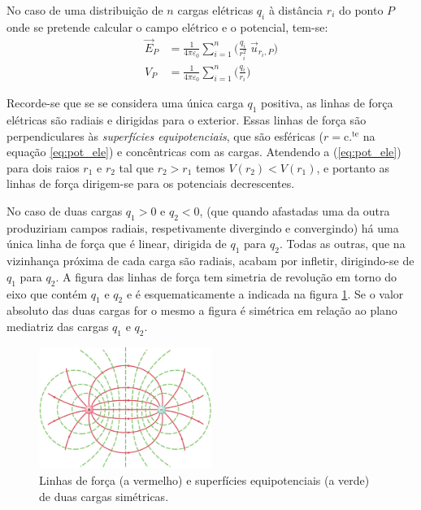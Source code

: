 \documentclass[a4paper,twoside,12pt]{article}      %
\begin{document}
No caso de uma distribuição de $n$ cargas elétricas $q_i$ à distância $r_i$ do ponto $P$ onde se pretende calcular o campo elétrico e o potencial, tem-se:
\begin{align}
	\vec{E}_P &= \frac{1}{4 \pi \varepsilon_0 } \sum_{i=1}^n \Big( \frac{q_i}{ r_i^2}\; \vec{u}_{r_i , P}  \Big) \nonumber \\ 
 V_P &= \frac{1}{4 \pi \varepsilon_0 } \sum_{i=1}^n \Big( \frac{q_i}{ r_i}  \Big) \nonumber
\end{align}



Recorde-se que se se considera uma única carga $q_1$ positiva, as linhas de força elétricas são radiais e dirigidas para o exterior. Essas linhas de força são perpendiculares às \emph{superfícies equipotenciais}, que são esféricas ($r = \mathrm{c.^{te}}$ na equação \ref{eq:pot_ele}) e concêntricas com as cargas. Atendendo a (\ref{eq:pot_ele}) para dois raios $r_1$ e $r_2$ tal que $r_2 > r_1$ temos $V(r_2) < V(r_1)$, e portanto as linhas de força dirigem-se para os potenciais decrescentes.

No caso de duas cargas $q_1 > 0$ e $q_2 < 0$, (que quando afastadas uma da outra produziriam campos radiais, respetivamente divergindo e convergindo) há uma única linha de força que é linear, dirigida de $q_1$ para $q_2$. Todas as outras, que na vizinhança próxima de cada carga são radiais, acabam por infletir, dirigindo-se de $q_1$ para $q_2$. A figura das linhas de força tem simetria de revolução em torno do eixo que contém $q_1$ e $q_2$ e é esquematicamente a indicada na figura \ref{fig:sup-equip}. Se o valor absoluto das duas cargas for o mesmo a figura é simétrica em relação ao plano mediatriz das cargas $q_1$ e $q_2$.

\begin{figure}[tb]
  \centering 
	\includegraphics[width=0.5\textwidth]{./fig2-thomson} 
	\caption{ Linhas de força (a vermelho) e superfícies equipotenciais (a verde) de duas cargas simétricas. \label{fig:sup-equip}} 
\end{figure}
\end{document}
